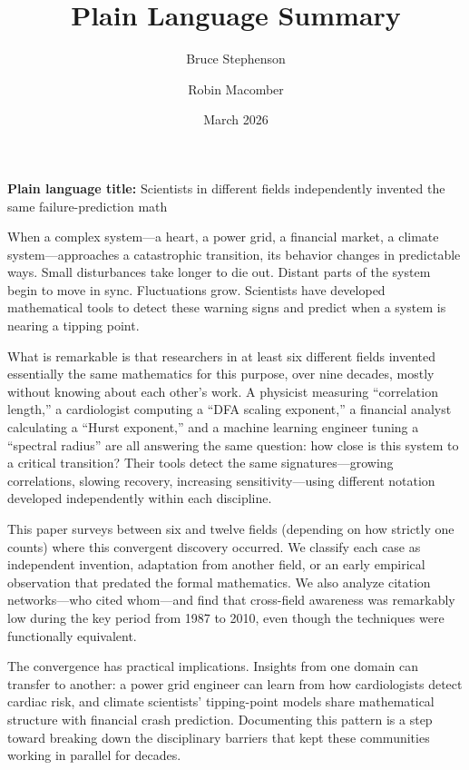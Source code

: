\documentclass[11pt]{article}
\title{Plain Language Summary}
\author{Bruce Stephenson \and Robin Macomber}
\date{March 2026}
\begin{document}
\maketitle
\doublespacing

\noindent\textbf{Plain language title:} Scientists in different fields independently invented the same failure-prediction math

\bigskip

When a complex system---a heart, a power grid, a financial market, a climate system---approaches a catastrophic transition, its behavior changes in predictable ways. Small disturbances take longer to die out. Distant parts of the system begin to move in sync. Fluctuations grow. Scientists have developed mathematical tools to detect these warning signs and predict when a system is nearing a tipping point.

What is remarkable is that researchers in at least six different fields invented essentially the same mathematics for this purpose, over nine decades, mostly without knowing about each other's work. A physicist measuring ``correlation length,'' a cardiologist computing a ``DFA scaling exponent,'' a financial analyst calculating a ``Hurst exponent,'' and a machine learning engineer tuning a ``spectral radius'' are all answering the same question: how close is this system to a critical transition? Their tools detect the same signatures---growing correlations, slowing recovery, increasing sensitivity---using different notation developed independently within each discipline.

This paper surveys between six and twelve fields (depending on how strictly one counts) where this convergent discovery occurred. We classify each case as independent invention, adaptation from another field, or an early empirical observation that predated the formal mathematics. We also analyze citation networks---who cited whom---and find that cross-field awareness was remarkably low during the key period from 1987 to 2010, even though the techniques were functionally equivalent.

The convergence has practical implications. Insights from one domain can transfer to another: a power grid engineer can learn from how cardiologists detect cardiac risk, and climate scientists' tipping-point models share mathematical structure with financial crash prediction. Documenting this pattern is a step toward breaking down the disciplinary barriers that kept these communities working in parallel for decades.
\end{document}
